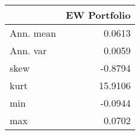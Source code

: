 \begin{tabular}{lr}
\toprule
{} &  EW Portfolio \\
\midrule
Ann. mean &        0.0613 \\
Ann. var  &        0.0059 \\
skew      &       -0.8794 \\
kurt      &       15.9106 \\
min       &       -0.0944 \\
max       &        0.0702 \\
\bottomrule
\end{tabular}
